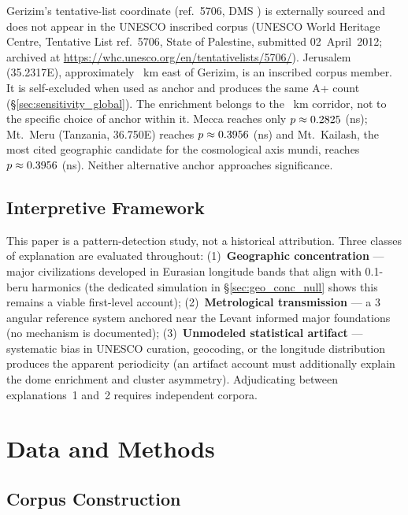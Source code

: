 \documentclass[HARVARD,twocolumn]{USG}
\begin{document}
Gerizim's tentative-list coordinate (ref.~5706, DMS \GerizimLonDMS{}) is
externally sourced and does not appear in the UNESCO inscribed corpus
(UNESCO World Heritage Centre, Tentative List ref.~5706, State of Palestine,
submitted 02~April~2012; archived at
\url{https://whc.unesco.org/en/tentativelists/5706/}).
Jerusalem (35.2317\textdegree{}E), approximately \GerizimJerusalemKm~km east
of Gerizim, is an inscribed corpus member. It is self-excluded when used as
anchor and produces the same A+ count (\S\ref{sec:sensitivity_global}).
The enrichment belongs to the \GerizimJerusalemKm~km corridor, not to the
specific choice of anchor within it.
Mecca reaches only $p \approx 0.2825$ (ns);
Mt.\ Meru (Tanzania, 36.750\textdegree{}E) reaches $p \approx 0.3956$ (ns)
and Mt.\ Kailash, the most cited geographic candidate for the cosmological
axis mundi, reaches $p \approx 0.3956$ (ns).
Neither alternative anchor approaches significance.

\subsection{Interpretive Framework}
\label{sec:framework}

This paper is a pattern-detection study, not a historical attribution.
Three classes of explanation are evaluated throughout:
(1)~\textbf{Geographic concentration} — major civilizations developed in
Eurasian longitude bands that align with 0.1-beru harmonics (the dedicated
simulation in \S\ref{sec:geo_conc_null} shows this remains a viable first-level account);
(2)~\textbf{Metrological transmission} — a 3\textdegree{} angular reference
system anchored near the Levant informed major foundations (no mechanism is documented);
(3)~\textbf{Unmodeled statistical artifact} — systematic bias in UNESCO curation,
geocoding, or the longitude distribution produces the apparent periodicity
(an artifact account must additionally explain the dome enrichment and cluster asymmetry).
Adjudicating between explanations~1 and~2 requires independent corpora.

\section{Data and Methods}
\label{sec:methods}

\subsection{Corpus Construction}
\label{sec:corpus}
\end{document}
